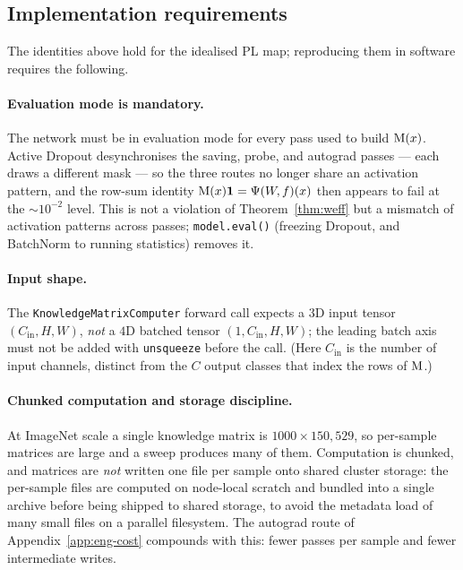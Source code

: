 \subsection{Implementation requirements}
\label{app:eng-gotchas}

The identities above hold for the idealised PL map; reproducing them in software
requires the following.

\paragraph{Evaluation mode is mandatory.}
The network must be in evaluation mode for every pass used to build $\mathrm{M}(x)$.
Active Dropout desynchronises the saving, probe, and autograd passes --- each
draws a different mask --- so the three routes no longer share an activation
pattern, and the row-sum identity $\mathrm{M}(x)\mathbf{1}=\Psi(W\!,f)(x)$ then appears to fail at
the $\sim10^{-2}$ level. This is not a violation of Theorem~\ref{thm:weff} but a
mismatch of activation patterns across passes; \texttt{model.eval()} (freezing
Dropout, and BatchNorm to running statistics) removes it.

\paragraph{Input shape.}
The \texttt{KnowledgeMatrixComputer} forward call expects a $3$D input tensor
$(C_{\text{in}},H,W)$, \emph{not} a $4$D batched tensor $(1,C_{\text{in}},H,W)$;
the leading batch axis must not be added with \texttt{unsqueeze} before the
call. (Here $C_{\text{in}}$ is the number of input channels, distinct from the
$C$ output classes that index the rows of $\mathrm{M}$.)

\paragraph{Chunked computation and storage discipline.}
At ImageNet scale a single knowledge matrix is $1000\times150{,}529$, so per-sample
matrices are large and a sweep produces many of them. Computation is chunked, and
matrices are \emph{not} written one file per sample onto shared cluster storage:
the per-sample files are computed on node-local scratch and bundled into a single
archive before being shipped to shared storage, to avoid the metadata load of
many small files on a parallel filesystem. The autograd route of
Appendix~\ref{app:eng-cost} compounds with this: fewer passes per sample and
fewer intermediate writes.

